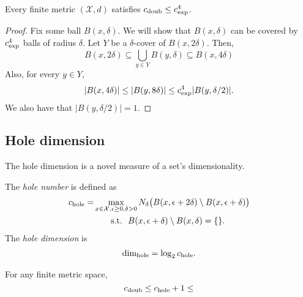 \documentclass[../main.tex]{subfiles}
\newcommand{\set}[1]{\mathcal {#1}}
\newcommand{\krdim}{\text{dim}_\textnormal{exp}}
\newcommand{\doubdim}{\text{dim}_\textnormal{doub}}
\newcommand{\holedim}{\text{dim}_{\textnormal{hole}}}
\newcommand{\cexp}{c_\textnormal{exp}}
\newcommand{\cdoub}{c_\textnormal{doub}}
\newcommand{\chole}{c_\textnormal{hole}}
\begin{document}
\begin{lemma}
    Every finite metric $(\set X,d)$ satisfies
    $\cdoub \le \cexp^4$.
\end{lemma}
\begin{proof}
    Fix some ball $B(x,\delta)$.
    We will show that $B(x,\delta)$ can be covered by $\cexp^4$ balls of radius $\delta$.
    Let $Y$ be a $\delta$-cover of $B(x,2\delta)$.
    Then,
    \begin{equation}
        B(x,2\delta) 
        \subseteq 
        \bigcup\limits_{y\in Y} B(y,\delta) 
        \subseteq
        B(x,4\delta)
    \end{equation}
    Also, for every $y\in Y$,
    \begin{equation}
        |B(x,4\delta)| 
        \le 
        |B(y,8\delta)| 
        \le 
        \cexp^4 |B(y,\delta/2)|
        .
    \end{equation}
    We also have that $|B(y,\delta/2)|=1$.
\end{proof}


\subsection{Hole dimension}

The hole dimension is a novel measure of a set's dimensionality.

The \emph{hole number} is defined as
\begin{align}
    \chole
    = 
    &\max_{x\in\set X, \epsilon \ge 0, \delta > 0} 
    N_\delta\big( B(x,\epsilon+2\delta) \setminus B(x,\epsilon+\delta) \big)
    \\
    &
    ~~~~~~\text{s.t.}
    ~~
    B(x,\epsilon+\delta) \setminus B(x,\delta) = \{\}
    .
\end{align}
The \emph{hole dimension} is
\begin{align}
    \holedim = \log_2 \chole
    .
\end{align}

\begin{lemma}
    For any finite metric space,
    \begin{equation}
        \cdoub \le \chole + 1 \le 
    \end{equation}
\end{lemma}
\end{document}
